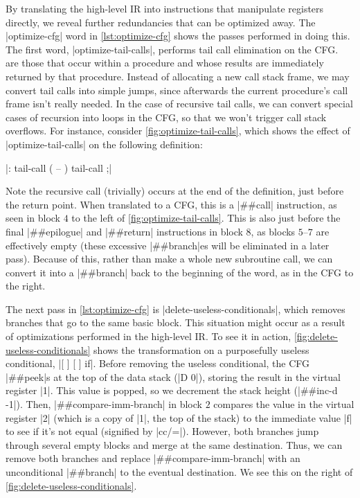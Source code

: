 By translating the high-level \gls{IR} into instructions that manipulate
registers directly, we reveal further redundancies that can be optimized away.
The \factor|optimize-cfg| word in \vref{lst:optimize-cfg} shows the passes
performed in doing this.  The first word, \factor|optimize-tail-calls|,
performs tail call elimination on the \gls{CFG}.
%
~ are those
that occur within a procedure and whose results are immediately returned by
that procedure.  Instead of allocating a new call stack frame, we may convert
tail calls into simple jumps, since afterwards the current procedure's call
frame isn't really needed.  In the case of recursive tail calls, we can convert
special cases of recursion into loops in the \gls{CFG}, so that we won't
trigger call stack overflows.  For instance, consider
\vref{fig:optimize-tail-calls}, which shows the effect of
\factor|optimize-tail-calls| on the following definition:
%
\begin{center}
%
  \factor|: tail-call ( -- ) tail-call ;|
%
\end{center}
%
\noindent Note the recursive call (trivially) occurs at the end of the
definition, just before the return point.  When translated to a \gls{CFG}, this
is a \factor|##call| instruction, as seen in block $4$ to the left of
\vref{fig:optimize-tail-calls}.  This is also just before the final
\factor|##epilogue| and \factor|##return| instructions in block $8$, as blocks
$5$--$7$ are effectively empty (these excessive \factor|##branch|es will be
eliminated in a later pass).  Because of this, rather than make a whole new
subroutine call, we can convert it into a \factor|##branch| back to the
beginning of the word, as in the \gls{CFG} to the right.


The next pass in \vref{lst:optimize-cfg} is
\factor|delete-useless-conditionals|, which removes branches that go to the
same basic block.  This situation might occur as a result of optimizations
performed in the high-level \gls{IR}.  To see it in action,
\vref{fig:delete-useless-conditionals} shows the transformation on a
purposefully useless conditional,
%
\factor|[ ] [ ] if|.
%
Before removing the useless conditional, the \gls{CFG} \factor|##peek|s at the
top of the data stack
%
(\factor|D 0|),
%
storing the result in the virtual register \factor|1|.  This value is popped,
so we decrement the stack height
%
(\factor|##inc-d -1|).
%
Then, \factor|##compare-imm-branch| in block $2$ compares the value in the
virtual register \factor|2| (which is a copy of \factor|1|, the top of the
stack) to the immediate value \factor|f| to see if it's not equal (signified by
\factor|cc/=|).  However, both branches jump through several empty blocks and
merge at the same destination.  Thus, we can remove both branches and replace
\factor|##compare-imm-branch| with an unconditional \factor|##branch| to the
eventual destination.  We see this on the right of
\vref{fig:delete-useless-conditionals}.

